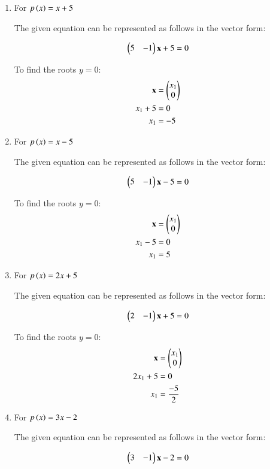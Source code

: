 \begin{enumerate}

\item  For $p\left(x\right) = x + 5$ 
\begin{flushleft}
The given equation can be represented as follows in the vector form:
\end{flushleft}
\begin{align}
\begin{pmatrix}
5 & -1
\end{pmatrix}
\mathbf{x} + 5 = 0
\end{align}

To find the roots $y=0$: 
\begin{align}
\mathbf{x} &= \begin{pmatrix}x_1\\0\end{pmatrix} \\
x_1 + 5 &= 0 \\
x_1 &= -5
\end{align}

\item  For $p\left(x\right) = x - 5$
\begin{flushleft}
The given equation can be represented as follows in the vector form:
\end{flushleft}
\begin{align}
\begin{pmatrix}
5 & -1 
\end{pmatrix}
\mathbf{x} - 5 = 0
\end{align}

To find the roots $y=0$:
\begin{align}
\mathbf{x} &= \begin{pmatrix}x_1\\0\end{pmatrix} \\
x_1 - 5 &= 0 \\
x_1 &= 5
\end{align}
\item  For $p\left(x\right) = 2x + 5$
\begin{flushleft}
The given equation can be represented as follows in the vector form:
\end{flushleft}
\begin{align}
\begin{pmatrix}
2 & -1 
\end{pmatrix}
\mathbf{x} + 5 = 0
\end{align}

To find the roots $y=0$:
\begin{align}
\mathbf{x} &= \begin{pmatrix}x_1\\0\end{pmatrix} \\
2x_1 + 5 &= 0 \\
x_1 &= \frac{-5}{2}
\end{align}
\item  For $p\left(x\right) = 3x - 2$
\begin{flushleft}
The given equation can be represented as follows in the vector form:
\end{flushleft}
\begin{align}
\begin{pmatrix}
3 & -1 
\end{pmatrix}
\mathbf{x} - 2 = 0
\end{align}


\end{enumerate}
